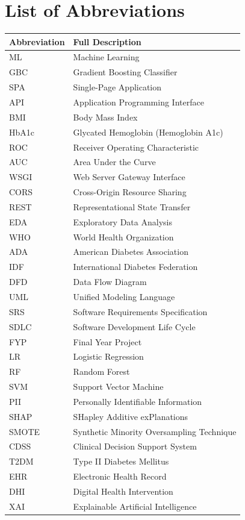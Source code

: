 \documentclass[12pt,a4paper]{report}
\begin{document}
\chapter*{List of Abbreviations}
\begin{center}
\begin{longtable}{ll}
\toprule
\textbf{Abbreviation} & \textbf{Full Description} \\
\midrule
ML   & Machine Learning \\
GBC  & Gradient Boosting Classifier \\
SPA  & Single-Page Application \\
API  & Application Programming Interface \\
BMI  & Body Mass Index \\
HbA1c & Glycated Hemoglobin (Hemoglobin A1c) \\
ROC  & Receiver Operating Characteristic \\
AUC  & Area Under the Curve \\
WSGI & Web Server Gateway Interface \\
CORS & Cross-Origin Resource Sharing \\
REST & Representational State Transfer \\
EDA  & Exploratory Data Analysis \\
WHO  & World Health Organization \\
ADA  & American Diabetes Association \\
IDF  & International Diabetes Federation \\
DFD  & Data Flow Diagram \\
UML  & Unified Modeling Language \\
SRS  & Software Requirements Specification \\
SDLC & Software Development Life Cycle \\
FYP  & Final Year Project \\
LR   & Logistic Regression \\
RF   & Random Forest \\
SVM  & Support Vector Machine \\
PII  & Personally Identifiable Information \\
SHAP & SHapley Additive exPlanations \\
SMOTE & Synthetic Minority Oversampling Technique \\
CDSS & Clinical Decision Support System \\
T2DM & Type II Diabetes Mellitus \\
EHR  & Electronic Health Record \\
DHI  & Digital Health Intervention \\
XAI  & Explainable Artificial Intelligence \\
\bottomrule
\end{longtable}
\end{center}
\end{document}
